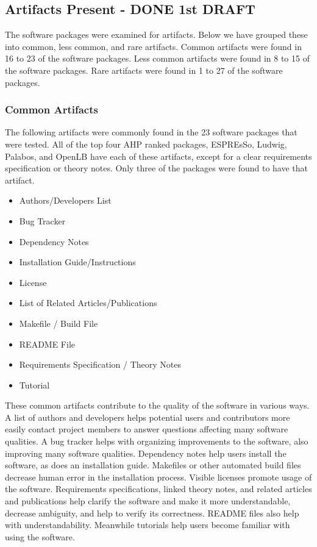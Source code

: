 \documentclass[12pt, notitlepage]{article}
\begin{document}
\subsection{Artifacts Present - DONE 1st DRAFT}\label{artifacts}

The software packages were examined for artifacts. Below we have grouped these into common, less common, and rare artifacts. Common artifacts were found in 16 to 23 of the software packages. Less common artifacts were found in 8 to 15 of the software packages. Rare artifacts were found in 1 to 27 of the software packages. 

\subsubsection{Common Artifacts}
The following artifacts were commonly found in the 23 software packages that were tested. All of the top four AHP ranked packages, ESPREsSo, Ludwig, Palabos, and OpenLB have each of these artifacts, except for a clear requirements specification or theory notes. Only three of the packages were found to have that artifact. 

\begin{singlespace}
\begin{multicols}{2}	
\begin{itemize}
	\item Authors/Developers List
	\item Bug Tracker
	\item Dependency Notes 
	\item Installation Guide/Instructions 
	\item License
	\item List of Related Articles/Publications 
	\item Makefile / Build File 
	\item README File 
	\item Requirements Specification / Theory Notes
	\item Tutorial
\end{itemize}
\end{multicols}
\end{singlespace}

These common artifacts contribute to the quality of the software in various ways. A list of authors and developers helps potential users and contributors more easily contact project members to answer questions affecting many software qualities. A bug tracker helps with organizing improvements to the software, also improving many software qualities. Dependency notes help users install the software, as does an installation guide. Makefiles or other automated build files decrease human error in the installation process. Visible licenses promote usage of the software. Requirements specifications, linked theory notes, and related articles and publications help clarify the software and make it more understandable, decrease ambiguity, and help to verify its correctness. README files also help with understandability. Meanwhile tutorials help users become familiar with using the software.
\end{document}
